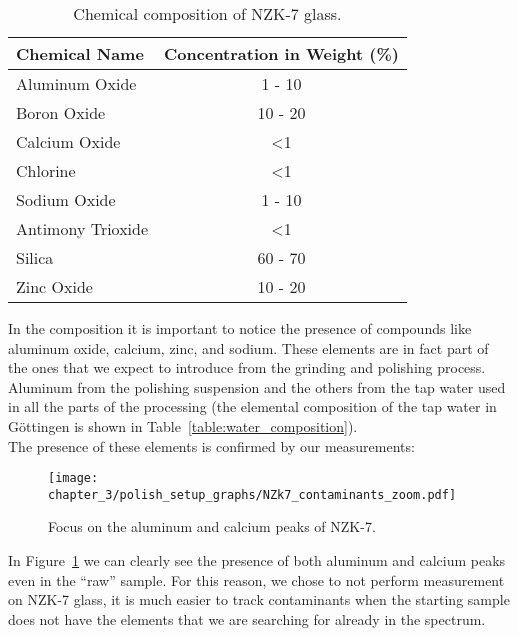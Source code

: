\begin{table}[H]
    \centering
\begin{tabular}{|l|c|}
\hline
Chemical Name     & Concentration in Weight (\%) \\ \hline
Aluminum Oxide    & 1 - 10                         \\ \hline
Boron Oxide       & 10 - 20                        \\ \hline
Calcium Oxide     & \textless 1                  \\ \hline
Chlorine          & \textless 1                  \\ \hline
Sodium Oxide      & 1 - 10                       \\ \hline
Antimony Trioxide & \textless 1                  \\ \hline
Silica            & 60 - 70                        \\ \hline
Zinc Oxide        & 10 - 20                        \\ \hline
\end{tabular}
\caption{Chemical composition of NZK-7 glass. }
    \label{table:nzk7_concentration}
\end{table}

In the composition it is important to notice the presence of compounds like aluminum oxide, calcium, zinc, and sodium. These elements are in fact part of the ones that we expect to introduce from the grinding and polishing process. Aluminum from the polishing suspension and the others from the tap water used in all the parts of the processing (the elemental composition of the tap water in Göttingen is shown in Table~\ref{table:water_composition}).
\\
The presence of these elements is confirmed by our measurements:
\begin{figure}[H]
    \centering
    \texttt{[image: chapter\_3/polish\_setup\_graphs/NZk7\_contaminants\_zoom.pdf]} 
    \vspace*{-30pt}
    \caption{Focus on the aluminum and calcium peaks of NZK-7.}
    \label{fig:nzk7_aluminum_calcium}
\end{figure}
In Figure~\ref{fig:nzk7_aluminum_calcium} we can clearly see the presence of both aluminum and calcium peaks even in the “raw” sample. For this reason, we chose to not perform measurement on NZK-7 glass, it is much easier to track contaminants when the starting sample does not have the elements that we are searching for already in the spectrum.

